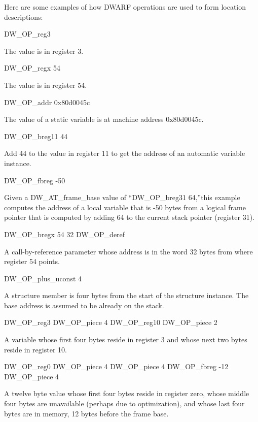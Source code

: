 Here are some examples of how DWARF operations are used to form location descriptions:

DW\_OP\_reg3
\begin{myindentpara}{1cm}
The value is in register 3.
\end{myindentpara}

DW\_OP\_regx 54
\begin{myindentpara}{1cm}
The value is in register 54.
\end{myindentpara}

DW\_OP\_addr 0x80d0045c
\begin{myindentpara}{1cm}
The value of a static variable is at machine address 0x80d0045c.
\end{myindentpara}

DW\_OP\_breg11 44
\begin{myindentpara}{1cm}
Add 44 to the value in register 11 to get the address of an automatic
variable instance.
\end{myindentpara}

DW\_OP\_fbreg -50
\begin{myindentpara}{1cm}
Given a DW\_AT\_frame\_base value of ``DW\_OP\_breg31 64,''this example
computes the address of a local variable that is -50 bytes from a
logical frame pointer that is computed by adding 64 to the current
stack pointer (register 31).
\end{myindentpara}

DW\_OP\_bregx 54 32 DW\_OP\_deref
\begin{myindentpara}{1cm}
A call-by-reference parameter whose address is in the word 32 bytes
from where register 54 points.
\end{myindentpara}

DW\_OP\_plus\_uconst 4
\begin{myindentpara}{1cm}
A structure member is four bytes from the start of the structure
instance. The base address is assumed to be already on the stack.
\end{myindentpara}

DW\_OP\_reg3 DW\_OP\_piece 4 DW\_OP\_reg10 DW\_OP\_piece 2
\begin{myindentpara}{1cm}
A variable whose first four bytes reside in register 3 and whose next
two bytes reside in register 10.
\end{myindentpara}

DW\_OP\_reg0 DW\_OP\_piece 4 DW\_OP\_piece 4 DW\_OP\_fbreg -12 DW\_OP\_piece 4
\begin{myindentpara}{1cm}
A twelve byte value whose first four bytes reside in register zero,
whose middle four bytes are unavailable (perhaps due to optimization),
and whose last four bytes are in memory, 12 bytes before the frame
base.
\end{myindentpara}

